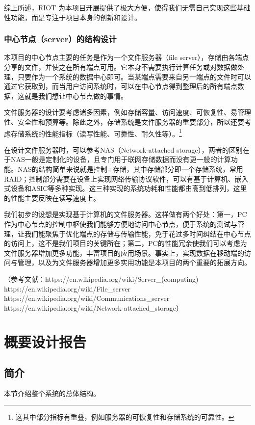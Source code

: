 \documentclass{ctexart}
\begin{document}
综上所述，RIOT 为本项目开展提供了极大方便，使得我们无需自己实现这些基础性功能，而是专注于项目本身的创新和设计。

\subsubsection{中心节点（server）的结构设计}

本项目的中心节点主要的任务是作为一个文件服务器（file server），存储由各端点分享的文件，并使之在所有端点可用。它本身不需要执行计算任务或对数据做处理，只要作为一个系统的数据中心即可。当某端点需要来自另一端点的文件时可以通过它获取到，而当用户访问系统时，可以在中心节点得到整理后的所有端点数据，这就是我们想让中心节点做的事情。

文件服务器的设计要考虑诸多因素，例如存储容量、访问速度、可恢复性、易管理性、安全性和预算等。除此之外，存储系统是文件服务器的重要部分，所以还要考虑存储系统的性能指标（读写性能、可靠性、耐久性等）。\footnote{这其中部分指标有重叠，例如服务器的可恢复性和存储系统的可靠性。}

在设计文件服务器时，可以参考NAS（Network-attached storage），两者的区别在于NAS一般是定制化的设备，且专门用于联网存储数据而没有更一般的计算功能。NAS的结构简单来说就是控制+存储，其中存储部分即一个存储系统，常用RAID；控制部分需要在设备上实现网络传输协议软件，可以有基于计算机、嵌入式设备和ASIC等多种实现。这三种实现的系统功耗和性能都由高到低排列，这里的性能主要反映在读写速度上。

我们初步的设想是实现基于计算机的文件服务器。这样做有两个好处：第一，PC作为中心节点的控制中枢使我们能够方便地访问中心节点，便于系统的测试与管理，让我们能聚焦于优化端点的存储与传输性能，免于花过多时间纠结在中心节点的访问上，这不是我们项目的关键所在；第二，PC的性能冗余使我们可以考虑为文件服务器增加更多功能，丰富项目的应用场景。事实上，实现数据在移动端的访问与管理，以及为文件服务器增加更多实用功能是本项目的两个重要的拓展方向。

（参考文献：https://en.wikipedia.org/wiki/Server\_(computing)\\
 https://en.wikipedia.org/wiki/File\_server\\ https://en.wikipedia.org/wiki/Communications\_server\\ https://en.wikipedia.org/wiki/Network-attached\_storage）

\section{概要设计报告}

\subsection{简介}
本节介绍整个系统的总体结构。
\end{document}
